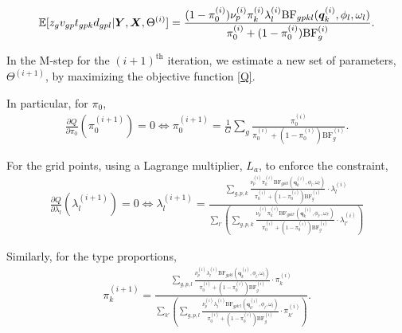 \documentclass[10pt]{article}
\newcommand{\Exp}{\mathbb{E}} %
\newcommand{\BF}{{\text{BF}}} %
\newcommand{\Xv}{\mbox{\boldmath$X$}}
\newcommand{\Yv}{\mbox{\boldmath$Y$}}
\begin{document}
\begin{equation}
  \begin{aligned}
    \Exp[z_g v_{gp} t_{gpk} d_{gpl} | \Yv, \Xv, \Theta^{(i)}] = \frac{(1-\pi_0^{(i)}) \nu_p^{(i)} \pi_k^{(i)} \lambda_l^{(i)} \BF_{gpkl}(\bm{q}_k^{(i)},\phi_l,\omega_l)}{\pi_0^{(i)} + (1-\pi_0^{(i)}) \BF^{(i)}_{g}}.
  \end{aligned}
\end{equation}


In the M-step for the $(i+1)^{\text{th}}$ iteration, we estimate a new set of parameters, $\Theta^{(i+1)}$, by maximizing the objective function \eqref{Q}.

In particular, for $\pi_0$,
\begin{equation}
  \begin{aligned}
    \frac{\partial Q}{\partial \pi_0}(\pi_0^{(i+1)}) = 0 \Leftrightarrow \pi_0^{(i+1)} = \frac{1}{G} \sum_g \frac{\pi_0^{(i)}}{\pi_0^{(i)} + (1-\pi_0^{(i)}) \BF_g^{(i)}}.
  \end{aligned}
\end{equation}

For the grid points, using a Lagrange multiplier, $L_a$, to enforce the constraint,
\begin{equation}
  \begin{aligned}
    \frac{\partial Q}{\partial \lambda_l}(\lambda_l^{(i+1)}) = 0 \Leftrightarrow \lambda_l^{(i+1)} = \frac{\sum_{g,p,k} \frac{\nu_p^{(i)} \pi_k^{(i)} \BF_{gpkl}(\bm{q}_k^{(i)},\phi_l,\omega_l)}{\pi_0^{(i)} + (1-\pi_0^{(i)}) \BF_g^{(i)}} \cdot \lambda_l^{(i)}}{\sum_{l'} \left( \sum_{g,p,k} \frac{\nu_p^{(i)} \pi_k^{(i)} \BF_{gpkl'}(\bm{q}_k^{(i)},\phi_{l'},\omega_{l'})}{\pi_0^{(i)} + (1-\pi_0^{(i)}) \BF_g^{(i)}} \cdot \lambda_{l'}^{(i)} \right)}
  \end{aligned}
\end{equation}

Similarly, for the type proportions,
\begin{equation}
  \begin{aligned}
    \pi_k^{(i+1)} = \frac{\sum_{g,p,l} \frac{\nu_p^{(i)} \lambda_l^{(i)} \BF_{gpkl}(\bm{q}_k^{(i)},\phi_l,\omega_l)}{\pi_0^{(i)} + (1-\pi_0^{(i)}) \BF_g^{(i)}} \cdot \pi_k^{(i)}}{\sum_{k'} \left( \sum_{g,p,l} \frac{\nu_p^{(i)} \lambda_l^{(i)} \BF_{gpk'l}(\bm{q}_{k'}^{(i)},\phi_l,\omega_l)}{\pi_0^{(i)} + (1-\pi_0^{(i)}) \BF_g^{(i)}} \cdot \pi_{k'}^{(i)} \right)}.
  \end{aligned}
\end{equation}
\end{document}
